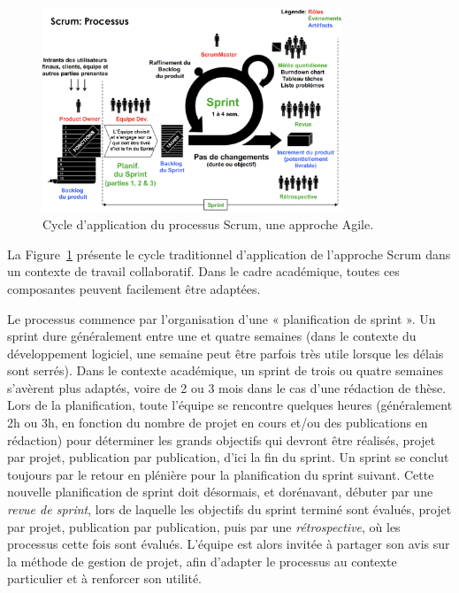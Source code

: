 \documentclass[
  letterpaper,
  DIV=11,
  numbers=noendperiod]{scrreprt}
\begin{document}
\begin{figure}

{\centering \includegraphics[width=0.8\textwidth,height=\textheight]{images/chapitre8_agilite.png}

}

\caption{\label{fig-scrum}Cycle d'application du processus Scrum, une
approche Agile.}

\end{figure}

La Figure~\ref{fig-scrum} présente le cycle traditionnel d'application
de l'approche Scrum dans un contexte de travail collaboratif. Dans le
cadre académique, toutes ces composantes peuvent facilement être
adaptées.

Le processus commence par l'organisation d'une « planification de sprint
». Un sprint dure généralement entre une et quatre semaines (dans le
contexte du développement logiciel, une semaine peut être parfois très
utile lorsque les délais sont serrés). Dans le contexte académique, un
sprint de trois ou quatre semaines s'avèrent plus adaptés, voire de 2 ou
3 mois dans le cas d'une rédaction de thèse. Lors de la planification,
toute l'équipe se rencontre quelques heures (généralement 2h ou 3h, en
fonction du nombre de projet en cours et/ou des publications en
rédaction) pour déterminer les grands objectifs qui devront être
réalisés, projet par projet, publication par publication, d'ici la fin
du sprint. Un sprint se conclut toujours par le retour en plénière pour
la planification du sprint suivant. Cette nouvelle planification de
sprint doit désormais, et dorénavant, débuter par une \emph{revue de
sprint}, lors de laquelle les objectifs du sprint terminé sont évalués,
projet par projet, publication par publication, puis par une
\emph{rétrospective}, où les processus cette fois sont évalués. L'équipe
est alors invitée à partager son avis sur la méthode de gestion de
projet, afin d'adapter le processus au contexte particulier et à
renforcer son utilité.
\end{document}
